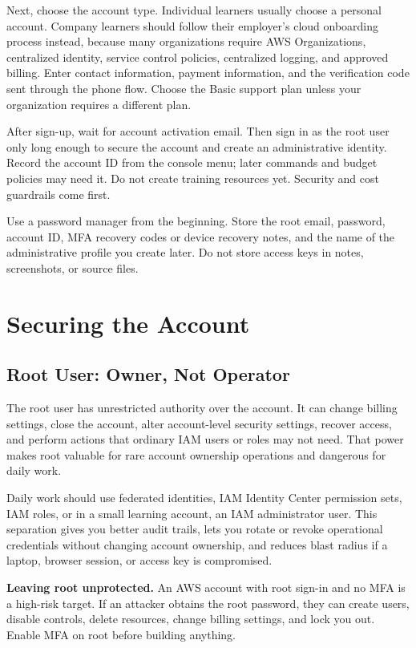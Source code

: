 Next, choose the account type. Individual learners usually choose a personal account. Company learners should follow their employer's cloud onboarding process instead, because many organizations require AWS Organizations, centralized identity, service control policies, centralized logging, and approved billing. Enter contact information, payment information, and the verification code sent through the phone flow. Choose the Basic support plan unless your organization requires a different plan.

After sign-up, wait for account activation email. Then sign in as the root user only long enough to secure the account and create an administrative identity. Record the account ID from the console menu; later commands and budget policies may need it. Do not create training resources yet. Security and cost guardrails come first.

\begin{tipbox}
Use a password manager from the beginning. Store the root email, password, account ID, MFA recovery codes or device recovery notes, and the name of the administrative profile you create later. Do not store access keys in notes, screenshots, or source files.
\end{tipbox}

\section{Securing the Account}
\subsection{Root User: Owner, Not Operator}
The root user has unrestricted authority over the account. It can change billing settings, close the account, alter account-level security settings, recover access, and perform actions that ordinary IAM users or roles may not need. That power makes root valuable for rare account ownership operations and dangerous for daily work.

Daily work should use federated identities, IAM Identity Center permission sets, IAM roles, or in a small learning account, an IAM administrator user. This separation gives you better audit trails, lets you rotate or revoke operational credentials without changing account ownership, and reduces blast radius if a laptop, browser session, or access key is compromised.

\begin{pitfall}
\textbf{Leaving root unprotected.} An AWS account with root sign-in and no MFA is a high-risk target. If an attacker obtains the root password, they can create users, disable controls, delete resources, change billing settings, and lock you out. Enable MFA on root before building anything.
\end{pitfall}

